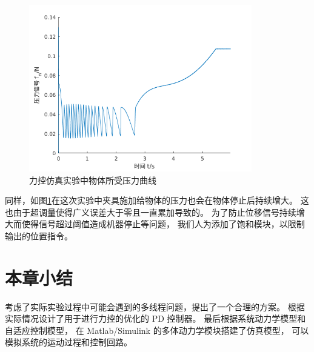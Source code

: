 \begin{figure}[!ht]
  \centering
  \includegraphics[width=9.7cm]{chapter04/pic/fn_x}
  \caption{\label{fig:fn_x}
    力控仿真实验中物体所受压力曲线}
  \vspace{-0.3cm}
\end{figure}


同样，如图\ref{fig:fn_x}在这次实验中夹具施加给物体的压力也会在物体停止后持续增大。
这也由于超调量使得广义误差大于零且一直累加导致的。
为了防止位移信号持续增大而使得信号超过阈值造成机器停止等问题，
我们人为添加了饱和模块，以限制输出的位置指令。

\section{本章小结}
考虑了实际实验过程中可能会遇到的多线程问题，提出了一个合理的方案。
根据实际情况设计了用于进行力控的优化的 PD 控制器。
最后根据系统动力学模型和自适应控制模型，
在 Matlab/Simulink 的多体动力学模块搭建了仿真模型，
可以模拟系统的运动过程和控制回路。

